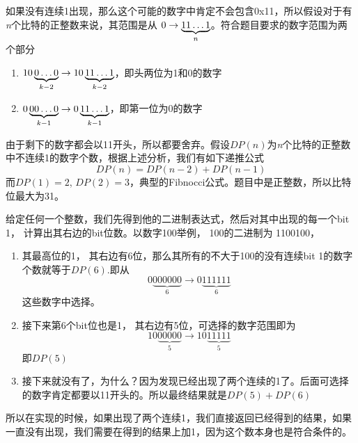 \documentclass[a4paper,12pt]{article}
\begin{document}
	\begin{CJK*}{UTF8}{gbsn}
		如果没有连续1出现，那么这个可能的数字中肯定不会包含0x11\textellipsis，所以假设对于有\textit{n}个比特的正整数来说，其范围是从 $0 \to \underbrace{11\mathellipsis 1}_{n}$。符合题目要求的数字范围为两个部分
		\begin{enumerate}
			\item $10\underbrace{0\mathellipsis0}_{k-2} \to 10\underbrace{11\mathellipsis1}_{k-2}$，即头两位为1和0的数字
			\item $0\underbrace{00\mathellipsis0}_{k-1} \to 0\underbrace{11\mathellipsis1}_{k-1}$，即第一位为0的数字
		\end{enumerate}
		由于剩下的数字都会以11开头，所以都要舍弃。假设$DP(n)$为\textit{n}个比特的正整数中不连续1的数字个数，根据上述分析，我们有如下递推公式
		\[
		DP(n) = DP(n-2)+DP(n-1)
		\]
		而$DP(1)=2$, $DP(2)=3$，典型的Fibnocci公式。题目中是正整数，所以比特位最大为31。
		\par
		给定任何一个整数，我们先得到他的二进制表达式，然后对其中出现的每一个bit 1， 计算出其右边的bit位数。以数字100举例， 100的二进制为 1100100，
		\begin{enumerate}
			\item 其最高位的1， 其右边有6位，那么其所有的不大于100的没有连续bit 1的数字个数就等于$DP(6)$.即从
			$$
			0\underbrace{000000}_{6} \rightarrow 0\underbrace{111111}_{6}
			$$
			这些数字中选择。
			\item 接下来第6个bit位也是1， 其右边有5位，可选择的数字范围即为
			$$
			10\underbrace{00000}_{5} \rightarrow 10\underbrace{11111}_{5}
			$$
			即$DP(5)$
			\item 接下来就没有了，为什么？因为发现已经出现了两个连续的1了。后面可选择的数字肯定都要以11开头的。所以最终结果就是$DP(5)+DP(6)$
		\end{enumerate}
		所以在实现的时候，如果出现了两个连续1，我们直接返回已经得到的结果，如果一直没有出现，我们需要在得到的结果上加1，因为这个数本身也是符合条件的。
		
		\clearpage
	\end{CJK*}
\end{document}
